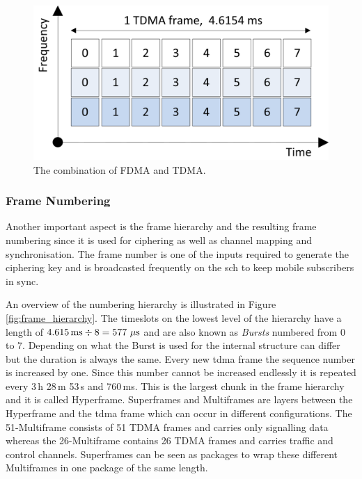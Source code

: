 \begin{figure}
	\centering
	\includegraphics{../Images/TDMAFDMA}
	\caption{The combination of FDMA and TDMA.}
	\label{fig:fdma_tdma}
\end{figure}

\subsubsection{Frame Numbering}
Another important aspect is the frame hierarchy and the resulting frame numbering since it is used for ciphering as well as channel mapping and synchronisation.
The frame number is one of the inputs required to generate the ciphering key and is broadcasted frequently on the \gls{sch} to keep mobile subscribers in sync.

An overview of the numbering hierarchy is illustrated in Figure \ref{fig:frame_hierarchy}.
The timeslots  on the lowest level of the hierarchy have a length of $4.615\text{\,ms} \div 8 = 577~\mu\text{s}$ and are also known as \emph{Bursts} numbered from 0 to 7.
Depending on what the Burst is used for the internal structure can differ but the duration is always the same.
Every new \gls{tdma} frame the sequence number is increased by one.
Since this number cannot be increased endlessly it is repeated every 3\,h 28\,m 53\,s and 760\,ms.
This is the largest chunk in the frame hierarchy and it is called Hyperframe.
Superframes and Multiframes are layers between the Hyperframe and the \gls{tdma} frame which can occur in different configurations.
The 51-Multiframe consists of 51 TDMA frames and carries only signalling data whereas the 26-Multiframe contains 26 TDMA frames and carries traffic and control channels.
Superframes can be seen as packages to wrap these different Multiframes in one package of the same length.

